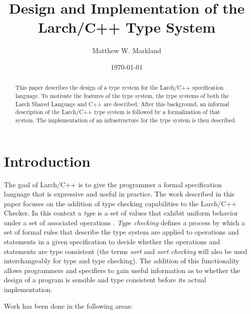 \documentclass[12pt]{article} %
\begin{document}

\setcounter{page}{1}

\author{Matthew W. Markland}
\title{Design and Implementation of the Larch/C++ Type System}
\date{\today}
\maketitle
\begin{abstract}
This paper describes the design of a type system for the Larch/C++
specification language. To motivate the features of the type system,
the type systems of both the Larch Shared Language and C++ are
described. After this background, an informal description of the
Larch/C++ type system is followed by a formalization of that
system. The implementation of an infrastructure for the type system is
then described.
\end{abstract}

%
\section{Introduction}
\label{introduction}
The goal of Larch/C++ \cite{Leavens96c} is to give the programmer a
formal specification language that is expressive and useful in
practice. The work described in this paper focuses on the addition of
type checking capabilities to the Larch/C++ Checker. In
this context a
\emph{type} is a set of values that exhibit uniform behavior under
a set of associated operations \cite{Watt90}. \emph{Type checking}
defines a process by which a set of formal rules that describe the
type system are applied to operations and statements in a given
specification to decide whether the operations and statements are type
consistent (the terms \emph{sort} and \emph{sort checking} will also
be used interchangeably for type and type checking). The addition of
this functionality allows programmers and specifiers to gain useful
information as to whether the design of a program is sensible and type
consistent before its actual implementation.  

Work has been done in the following areas:
\end{document}
